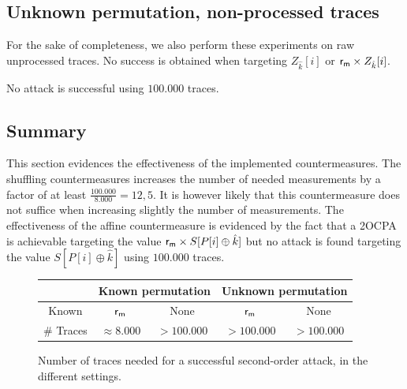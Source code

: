 \subsection{Unknown permutation, non-processed traces}
For the sake of completeness, we also perform these experiments on raw unprocessed traces. No success is obtained when targeting $Z_{\hat{k}}[i]$ or $\mathsf{r_m} \times Z_{\hat{k}}[i]$.

No attack is successful using $100.000$ traces.

\subsection{Summary}
This section evidences the effectiveness of the implemented countermeasures. 
The shuffling countermeasures increases the number of needed measurements by a factor of at least $\frac{100.000}{8.000} = 12,5$. It is however likely that this countermeasure does not suffice when increasing slightly the number of measurements.
The effectiveness of the affine countermeasure is evidenced by the fact that a 2OCPA is achievable targeting the value $\mathsf{r_m} \times S[P[i] \oplus \hat{k}]$
but no attack is found targeting the value $S[P[i] \oplus \hat{k}]$ using $100.000$ traces.

\begin{figure}[h!]
\centering
\begin{tabular}{|c|c|c|c|c|}
  \hline
   & \multicolumn{2}{c|}{Known permutation}&\multicolumn{2}{c|}{Unknown permutation}\\
  \hline
  Known & $\mathsf{r_m} $ &  None  & $\mathsf{r_m} $  &  None \\
  \hline
  \# Traces& $\approx 8.000$ & $ > 100.000$ & $ > 100.000$ & $> 100.000$\\
  \hline
\end{tabular}
\caption{Number of traces needed for a successful second-order attack, in the different settings.}
\end{figure}


